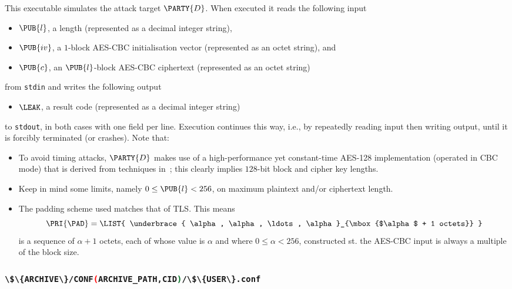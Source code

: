 \documentclass[crop={false},multi={true},tikz={true}]{standalone}
\begin{document}
This executable simulates the attack target $\PARTY{D}$.  When executed it 
reads the following input

\begin{itemize}
\item $\PUB{l}$,
      a  length
      (represented as a  decimal integer string),
\item $\PUB{iv}$,
      a      ${1}$-block AES-CBC initialisation vector
      (represented as an octet string),
      and
\item $\PUB{c}$,
      an $\PUB{l}$-block AES-CBC ciphertext
      (represented as an           octet string)
\end{itemize}

\noindent
from \lstinline[language={bash}]{stdin} and writes the following output

\begin{itemize}
\item $\LEAK$,
      a  result code
      (represented as a  decimal integer string)
\end{itemize}

\noindent
to \lstinline[language={bash}]{stdout}, in both cases with one field per 
line.  Execution continues this way, i.e., by repeatedly reading input 
then writing output, until it is forcibly terminated (or crashes).  
Note that:

\begin{itemize}
\item To avoid timing attacks, $\PARTY{D}$ makes use of a high-performance
      yet constant-time AES-128 implementation (operated in CBC mode) that
      is derived from techniques in~\cite{SCALE:KasSch:09};
      this clearly implies $128$-bit block and cipher key lengths.  
\item Keep in mind some limits, namely $0 \leq \PUB{l} < 256$, on maximum
      plaintext and/or ciphertext length.
\item The padding scheme used matches that of TLS.  This means
      \[
      \PRI{\PAD} = \LIST{ \underbrace{ \alpha, \alpha, \ldots, \alpha }_{\mbox{$\alpha$ + 1 octets}} }
      \]
      is a sequence of $\alpha + 1$ octets, each of whose value is $\alpha$
      and where $0 \leq \alpha < 256$, constructed st. the AES-CBC input is
      always a multiple of the block size.
\end{itemize}

\subsubsection{\lstinline[language={bash}]|\$\{ARCHIVE\}/CONF(ARCHIVE_PATH,CID)/\$\{USER\}.conf|}
\end{document}
